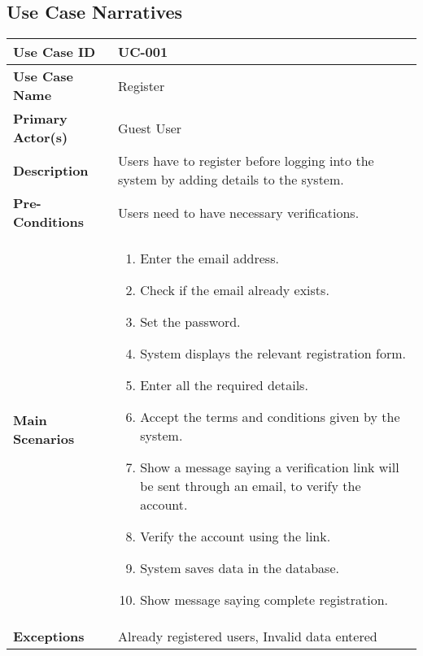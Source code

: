 \subsection{Use Case Narratives}

\begin{table}[!ht]
    \centering
    \begin{tabularx}{\textwidth}{|l|X|}
        \hline
        \textbf{Use Case ID} & UC-001 \\
        \hline
        \textbf{Use Case Name} & Register \\
        \hline
        \textbf{Primary Actor(s)} & Guest User \\
        \hline
        \textbf{Description} & Users have to register before logging into the system by adding details to the system. \\
        \hline
        \textbf{Pre-Conditions} & Users need to have necessary verifications. \\
        \hline
        \textbf{Main Scenarios} & 
        \begin{enumerate}[label=\arabic*.,itemsep=0pt]
            \item Enter the email address.
            \item Check if the email already exists.
            \item Set the password.
            \item System displays the relevant registration form.
            \item Enter all the required details.
            \item Accept the terms and conditions given by the system.
            \item Show a message saying a verification link will be sent through an email, to verify the account.
            \item Verify the account using the link.
            \item System saves data in the database.
            \item Show message saying complete registration.
        \end{enumerate} \\
        \hline
        \textbf{Exceptions} & Already registered users, Invalid data entered \\
        \hline

\end{tabularx}
\end{table}
